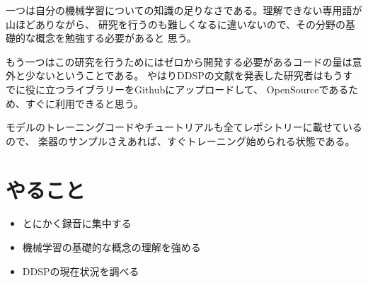 \documentclass[a4paper, 12pt]{article}
\begin{document}
一つは自分の機械学習についての知識の足りなさである。理解できない専用語が山ほどありながら、
研究を行うのも難しくなるに違いないので、その分野の基礎的な概念を勉強する必要があると
思う。

もう一つはこの研究を行うためにはゼロから開発する必要があるコードの量は意外と少ないということである。
やはりDDSPの文献を発表した研究者はもうすでに役に立つライブラリーをGithubにアップロードして、
OpenSourceであるため、すぐに利用できると思う。

モデルのトレーニングコードやチュートリアルも全てレポシトリーに載せているので、
楽器のサンプルさえあれば、すぐトレーニング始められる状態である。

\section*{やること}
\begin{itemize}
    \item とにかく録音に集中する
    \item 機械学習の基礎的な概念の理解を強める
    \item DDSPの現在状況を調べる
\end{itemize}



\end{document}
